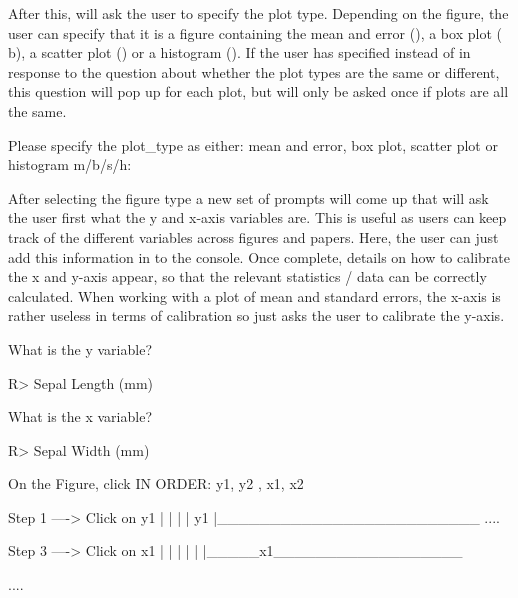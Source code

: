 \documentclass[article]{jss}
\newcommand{\fct}[1]{\code{#1()}}
\begin{document}
After this, \fct{metaDigitise} will ask the user to specify the plot type. Depending on the figure, the user can specify that it is a figure containing the mean and error (), a box plot (\code
{b}), a scatter plot () or a histogram (). If the user has specified  instead of  in response to the question about whether the plot types are the same or different, this question will pop up for each plot, but will only be asked once if plots are all the same.

\begin{CodeChunk}
\begin{CodeOutput}
Please specify the plot_type as either: mean and error, box plot,
 scatter plot or histogram m/b/s/h:
\end{CodeOutput}
\end{CodeChunk}

After selecting the figure type a new set of prompts will come up that will ask the user first what the y and x-axis variables are. This is useful as users can keep track of the different variables across figures and papers. Here, the user can just add this information in to the  console. Once complete, details on how to calibrate the x and y-axis appear, so that the relevant statistics / data can be correctly calculated. When working with a plot of mean and standard errors, the x-axis is rather useless in terms of calibration so  just asks the user to calibrate the y-axis. 

\begin{CodeChunk}
\begin{CodeOutput}
What is the y variable? 
\end{CodeOutput}
\begin{CodeInput}
R> Sepal Length (mm)
\end{CodeInput}

\begin{CodeOutput}
What is the x variable? 
\end{CodeOutput}
\begin{CodeInput}
R> Sepal Width (mm)
\end{CodeInput}

\begin{CodeOutput}
On the Figure, click IN ORDER: 
      y1, y2 , x1, x2  


    Step 1 ----> Click on y1
  |
  |
  |
  |
  y1
  |_________________________
  ....

    Step 3 ----> Click on x1
  |
  |
  |
  |
  |
  |_____x1__________________

  ....
\end{CodeOutput}
\end{CodeChunk}
\end{document}
